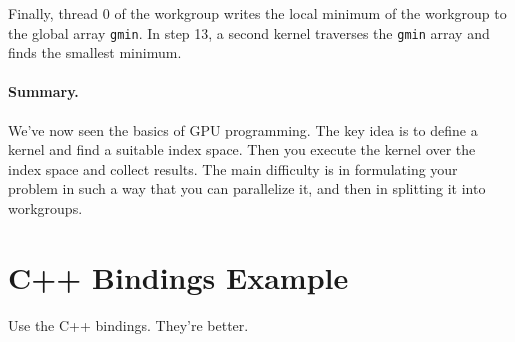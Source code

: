 \documentclass[a4paper]{report}
\begin{document}
Finally, thread 0 of the workgroup writes the local minimum of the
workgroup to the global array {\tt gmin}. In step 13, a second kernel
traverses the {\tt gmin} array and finds the smallest minimum.

\paragraph{Summary.} We've now seen the basics of GPU programming.
The key idea is to define a kernel and find a suitable index space.
Then you execute the kernel over the index space and collect results.
The main difficulty is in formulating your problem in such a way that
you can parallelize it, and then in splitting it into workgroups.


\section*{C++ Bindings Example}
Use the C++ bindings. They're better.
\end{document}
